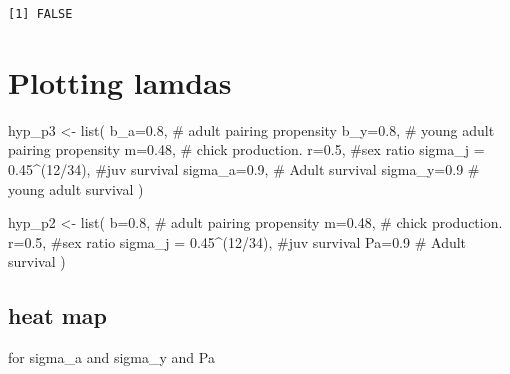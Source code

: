 \documentclass[
  letterpaper,
  DIV=11,
  numbers=noendperiod]{scrartcl}
\newenvironment{Shaded}{\begin{snugshade}}{\end{snugshade}}
\newcommand{\AttributeTok}[1]{\textcolor[rgb]{0.40,0.45,0.13}{#1}}
\newcommand{\CommentTok}[1]{\textcolor[rgb]{0.37,0.37,0.37}{#1}}
\newcommand{\DecValTok}[1]{\textcolor[rgb]{0.68,0.00,0.00}{#1}}
\newcommand{\FloatTok}[1]{\textcolor[rgb]{0.68,0.00,0.00}{#1}}
\newcommand{\FunctionTok}[1]{\textcolor[rgb]{0.28,0.35,0.67}{#1}}
\newcommand{\NormalTok}[1]{\textcolor[rgb]{0.00,0.23,0.31}{#1}}
\newcommand{\OtherTok}[1]{\textcolor[rgb]{0.00,0.23,0.31}{#1}}
\newcommand{\SpecialCharTok}[1]{\textcolor[rgb]{0.37,0.37,0.37}{#1}}
\begin{document}
\begin{verbatim}
[1] FALSE
\end{verbatim}

\section{Plotting lamdas}\label{plotting-lamdas}

\begin{Shaded}
\begin{Highlighting}[]
\NormalTok{hyp\_p3 }\OtherTok{\textless{}{-}} \FunctionTok{list}\NormalTok{(}
  \AttributeTok{b\_a=}\FloatTok{0.8}\NormalTok{,   }\CommentTok{\# adult pairing propensity}
  \AttributeTok{b\_y=}\FloatTok{0.8}\NormalTok{, }\CommentTok{\# young adult pairing propensity}
  \AttributeTok{m=}\FloatTok{0.48}\NormalTok{, }\CommentTok{\# chick production.    }
  \AttributeTok{r=}\FloatTok{0.5}\NormalTok{,   }\CommentTok{\#sex ratio   }
  \AttributeTok{sigma\_j =} \FloatTok{0.45}\SpecialCharTok{\^{}}\NormalTok{(}\DecValTok{12}\SpecialCharTok{/}\DecValTok{34}\NormalTok{), }\CommentTok{\#juv survival}
  \AttributeTok{sigma\_a=}\FloatTok{0.9}\NormalTok{,  }\CommentTok{\# Adult survival}
  \AttributeTok{sigma\_y=}\FloatTok{0.9} \CommentTok{\# young adult survival}
\NormalTok{)}

\NormalTok{hyp\_p2 }\OtherTok{\textless{}{-}} \FunctionTok{list}\NormalTok{(}
  \AttributeTok{b=}\FloatTok{0.8}\NormalTok{,   }\CommentTok{\# adult pairing propensity}
  \AttributeTok{m=}\FloatTok{0.48}\NormalTok{, }\CommentTok{\# chick production.    }
  \AttributeTok{r=}\FloatTok{0.5}\NormalTok{,   }\CommentTok{\#sex ratio   }
  \AttributeTok{sigma\_j =} \FloatTok{0.45}\SpecialCharTok{\^{}}\NormalTok{(}\DecValTok{12}\SpecialCharTok{/}\DecValTok{34}\NormalTok{), }\CommentTok{\#juv survival}
  \AttributeTok{Pa=}\FloatTok{0.9}  \CommentTok{\# Adult survival}
\NormalTok{)}
\end{Highlighting}
\end{Shaded}

\subsection{heat map}\label{heat-map}

for sigma\_a and sigma\_y and Pa
\end{document}
